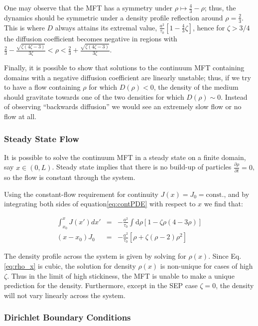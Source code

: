 \documentclass[
reprint, amsmath,amssymb,
]{revtex4-1}
\newcommand{\partDeriv}[2]{\frac{\partial #1}{\partial #2}}
\begin{document}
One may observe that the 
MFT has a symmetry under $\rho \mapsto \frac{4}{3} - \rho$; thus, the
dynamics should be symmetric under a density profile reflection around
$\rho = \frac{2}{3}$. This is where $D$ always attains its extremal
value, $ \frac{a^2}{\tau_0}\left[1 - \frac{4}{3}\zeta\right]$, hence
for $\zeta>3/4$ the diffusion coefficient becomes negative in regions
with $\frac{2}{3} - \frac{\sqrt{\zeta\left(4\zeta - 3\right)}}{3\zeta}
< \rho < \frac{2}{3} + \frac{\sqrt{\zeta\left(4\zeta -
    3\right)}}{3\zeta}$. 

Finally, it is possible to show that
solutions to the continuum MFT containing domains with a negative
diffusion coefficient are linearly unstable; thus, if we try to have a
flow containing $\rho$ for which $D(\rho)<0$, the density of the
medium should gravitate towards one of the two densities for which $D(\rho)\sim
0$. Instead of observing ``backwards diffusion'' we would see an
extremely slow flow or no flow at all. 

\subsubsection{Steady State Flow}

It is possible to solve the continuum MFT in a steady state on a
finite domain, say $x\in(0, L)$. Steady state implies that there is no
build-up of particles $\partDeriv{\rho}{t}=0$, so the flow is constant through the system.

Using the constant-flow requirement for continuity
$J(x)=J_0=\mathrm{const.}$, and by integrating both sides of
equation\ref{eq:contPDE} with respect to $x$ we find that:

\begin{eqnarray}
 \int_{x_0}^x J(x')dx' &=& -\frac{a^2}{\tau_0} \int \! \! \mathrm{d} \rho \left[1 - \zeta
   \rho\left(4-3\rho\right) \right]\\ (x-x_0)J_0 & = & -\frac{a^2}{\tau_0}\left[ \rho + \zeta (\rho -
 2) \rho^2 \right ]
\label{eq:rho_x}
\end{eqnarray}

The density profile across the system is given by solving for
$\rho(x)$.  Since Eq.\ref{eq:rho_x} is cubic, the solution for density
$\rho(x)$ is non-unique for cases of high $\zeta$.  Thus in the limit of
high stickiness, the MFT is unable to make a unique prediction for the
density.  Furthermore, except in the SEP case $\zeta=0$, the density
will not vary linearly across the system.

\subsubsection{Dirichlet Boundary Conditions}
\end{document}

